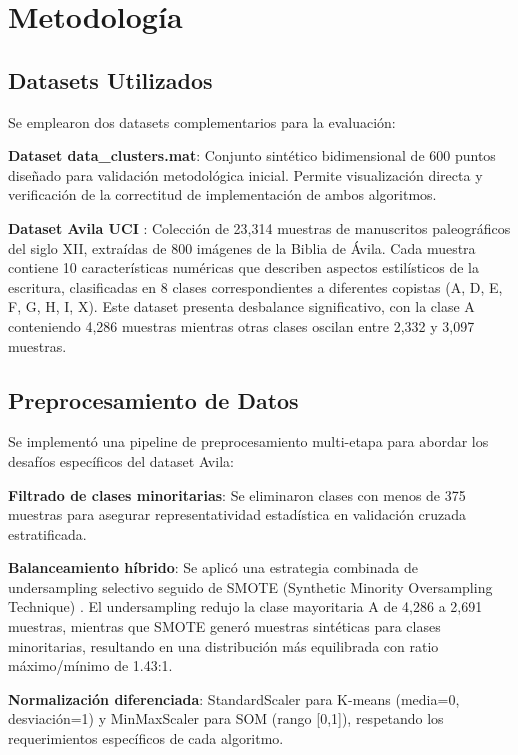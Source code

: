 \documentclass[12pt,a4paper]{article}
\begin{document}
\section{Metodología}

\subsection{Datasets Utilizados}

Se emplearon dos datasets complementarios para la evaluación:

\textbf{Dataset data\_clusters.mat}: Conjunto sintético bidimensional de 600 puntos diseñado para validación metodológica inicial. Permite visualización directa y verificación de la correctitud de implementación de ambos algoritmos.

\textbf{Dataset Avila UCI} \cite{dua2019}: Colección de 23,314 muestras de manuscritos paleográficos del siglo XII, extraídas de 800 imágenes de la Biblia de Ávila. Cada muestra contiene 10 características numéricas que describen aspectos estilísticos de la escritura, clasificadas en 8 clases correspondientes a diferentes copistas (A, D, E, F, G, H, I, X). Este dataset presenta desbalance significativo, con la clase A conteniendo 4,286 muestras mientras otras clases oscilan entre 2,332 y 3,097 muestras.

\subsection{Preprocesamiento de Datos}

Se implementó una pipeline de preprocesamiento multi-etapa para abordar los desafíos específicos del dataset Avila:

\textbf{Filtrado de clases minoritarias}: Se eliminaron clases con menos de 375 muestras para asegurar representatividad estadística en validación cruzada estratificada.

\textbf{Balanceamiento híbrido}: Se aplicó una estrategia combinada de undersampling selectivo seguido de SMOTE (Synthetic Minority Oversampling Technique) \cite{chawla2002}. El undersampling redujo la clase mayoritaria A de 4,286 a 2,691 muestras, mientras que SMOTE generó muestras sintéticas para clases minoritarias, resultando en una distribución más equilibrada con ratio máximo/mínimo de 1.43:1.

\textbf{Normalización diferenciada}: StandardScaler para K-means (media=0, desviación=1) y MinMaxScaler para SOM (rango [0,1]), respetando los requerimientos específicos de cada algoritmo.
\end{document}
